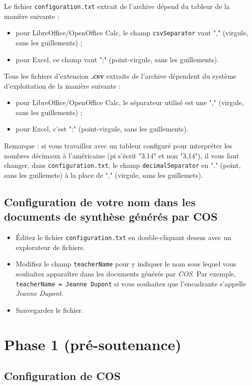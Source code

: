 \documentclass[11pt]{article}
\begin{document}
Le fichier \verb~configuration.txt~ extrait de l'archive dépend du tableur
de la manière suivante :
\begin{itemize}
\item pour LibreOffice/OpenOffice Calc, le champ \verb~csvSeparator~ vaut ","
(virgule, sans les guillements) ;
\item pour Excel, ce champ vaut ";" (point-virgule, sans les guillements).
\end{itemize}

Tous les fichiers d'extension \textbf{.csv} extraits de l'archive dépendent
du système d'exploitation de la manière suivante :
\begin{itemize}
\item pour LibreOffice/OpenOffice Calc, le séparateur utilisé est une ","
(virgule, sans les guillements) ;
\item pour Excel, c'est ";" (point-virgule, sans les guillements).
\end{itemize}

Remarque : si vous travaillez avec un tableur configuré pour
interpréter les nombres décimaux à l'américaine (pi s'écrit "3.14" et
non "3,14"), il vous faut changer, dans \verb~configuration.txt~, le champ
\verb~decimalSeparator~ en "." (point, sans les guillemets) à la place de
"," (virgule, sans les guillemets).

\subsection{Configuration de votre nom dans les documents de synthèse générés par COS}
\label{sec-3-2}
\begin{itemize}
\item Éditez le fichier \verb~configuration.txt~ en double-cliquant dessus
avec un explorateur de fichiers.
\item Modifiez le champ \verb~teacherName~ pour y indiquer le nom sous lequel
vous souhaitez apparaître dans les documents générés par \emph{COS}. Par
exemple, \verb~teacherName = Jeanne Dupont~ si vous souhaitez que
l'encadrante s'appelle \emph{Jeanne Dupont}.
\item Sauvegardez le fichier.
\end{itemize}
\section{Phase 1 (pré-soutenance)}
\label{sec-4}
\subsection{Configuration de COS}
\label{sec-4-1}
\end{document}
